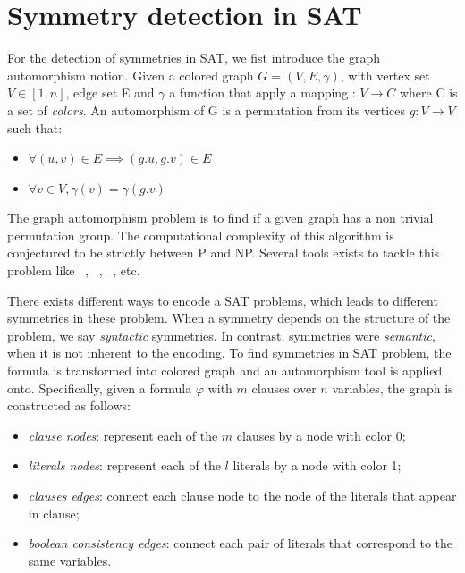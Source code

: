 %
%
%

\section{Symmetry detection in SAT}

For the detection of symmetries in SAT, we fist introduce the graph automorphism notion.
Given a colored graph $G = (V, E, \gamma)$, with vertex set $V \in  [1, n] $, edge set E and
$\gamma$ a function that apply a mapping : $V \rightarrow C$ where C is a set of \emph{colors}.
An automorphism of G is a permutation from its vertices $g :V \rightarrow V$ 
such that:
\begin{itemize}
	\item $\forall (u, v) \in E \implies (g.u, g.v) \in E$
	\item $\forall v \in V, \gamma(v) = \gamma(g.v)$
\end{itemize}

The graph automorphism problem is to find if a given graph has a non trivial permutation group. 
The computational complexity of this algorithm is conjectured to be strictly between P and NP.
Several tools exists to tackle this problem like \saucy~\cite{katebi2010symmetry},
\bliss~\cite{JunttilaKaski:ALENEX2007}, \nauty~\cite{mckay2003nauty}, etc.



There exists different ways to encode a SAT problems,
which leads to different symmetries in these problem.
When a symmetry depends on the structure of the problem, we say \emph{syntactic} symmetries. 
In contrast, symmetries were \emph{semantic}, when it is not inherent to the encoding.
To find symmetries in SAT problem, the formula is transformed into colored graph
and an automorphism tool is applied onto. Specifically, given a formula $\varphi$ with
$m$ clauses over $n$ variables, the graph is constructed as follows:
\begin{itemize}
	\item \emph{clause nodes}: represent each of the $m$ clauses by a node with color 0;
	\item \emph{literals nodes}: represent each of the $l$ literals by a node with color 1;
	\item \emph{clauses edges}: connect each clause node to the node of the literals that appear in clause;
	\item \emph{boolean consistency edges}: connect each pair of literals that correspond to the same variables.
\end{itemize}



